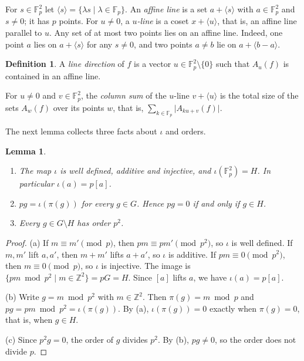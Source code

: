 \documentclass[11pt]{amsart}
\newtheorem{lemma}[theorem]{Lemma}
\theoremstyle{definition}\newtheorem{definition}[theorem]{Definition}
\theoremstyle{remark}\newtheorem{remark}[theorem]{Remark}
\newcommand{\F}{\mathbb{F}}
\newcommand{\Z}{\mathbb{Z}}
\newcommand{\abs}[1]{\lvert #1\rvert}
\newcommand{\gen}[1]{\langle #1\rangle}
\begin{document}
For \(s\in\F_p^2\) let \(\gen{s}=\{\lambda s\mid\lambda\in\F_p\}\).
An \emph{affine line} is a set \(a+\gen{s}\) with \(a\in\F_p^2\) and \(s\ne0\); it has \(p\) points.
For \(u\ne0\), a \emph{\(u\)-line} is a coset \(x+\gen{u}\), that is, an affine line parallel to \(u\).
Any set of at most two points lies on an affine line.
Indeed, one point \(a\) lies on \(a+\gen{s}\) for any \(s\ne0\), and two points \(a\ne b\) lie on \(a+\gen{b-a}\).

\begin{definition}\label{def:line}
A \emph{line direction} of \(f\) is a vector \(u\in\F_p^2\setminus\{0\}\) such that \(A_u(f)\) is contained in an affine line.
\end{definition}

For \(u\ne0\) and \(v\in\F_p^2\), the \emph{column sum} of the \(u\)-line \(v+\gen{u}\) is the total size of the sets \(A_w(f)\) over its points \(w\), that is, \(\sum_{k\in\F_p}\abs{A_{ku+v}(f)}\).

The next lemma collects three facts about \(\iota\) and orders.
\begin{lemma}\label{lem:facts}
\begin{enumerate}
\item[(a)] The map \(\iota\) is well defined, additive and injective, and \(\iota(\F_p^2)=H\). In particular \(\iota(a)=p[a]\).
\item[(b)] \(pg=\iota(\pi(g))\) for every \(g\in G\). Hence \(pg=0\) if and only if \(g\in H\).
\item[(c)] Every \(g\in G\setminus H\) has order \(p^2\).
\end{enumerate}
\end{lemma}

\begin{proof}
(a) If \(m\equiv m'\pmod p\), then \(pm\equiv pm'\pmod{p^2}\), so \(\iota\) is well defined.
If \(m,m'\) lift \(a,a'\), then \(m+m'\) lifts \(a+a'\), so \(\iota\) is additive.
If \(pm\equiv0\pmod{p^2}\), then \(m\equiv0\pmod p\), so \(\iota\) is injective.
The image is \(\{pm\bmod p^2\mid m\in\Z^2\}=pG=H\).
Since \([a]\) lifts \(a\), we have \(\iota(a)=p[a]\).

(b) Write \(g=m\bmod p^2\) with \(m\in\Z^2\).
Then \(\pi(g)=m\bmod p\) and \(pg=pm\bmod p^2=\iota(\pi(g))\).
By (a), \(\iota(\pi(g))=0\) exactly when \(\pi(g)=0\), that is, when \(g\in H\).

(c) Since \(p^2g=0\), the order of \(g\) divides \(p^2\).
By (b), \(pg\ne0\), so the order does not divide \(p\).
\end{proof}
\end{document}

